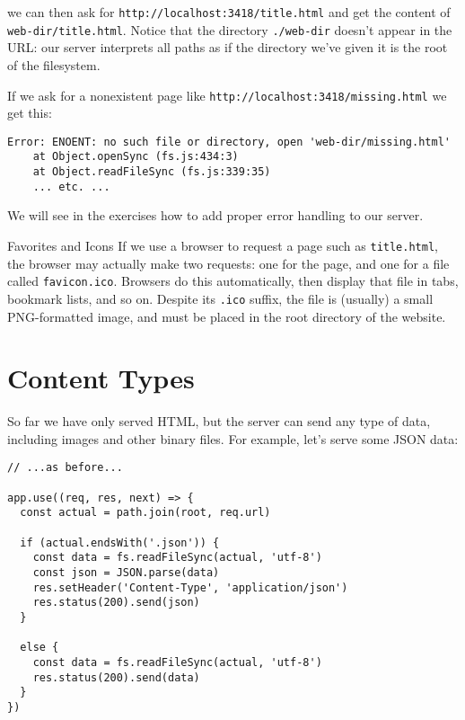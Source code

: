 \noindent
we can then ask for \texttt{http://localhost:3418/title.html}
and get the content of \texttt{web-dir/title.html}.
Notice that the directory \texttt{./web-dir} doesn't appear in the URL:
our server interprets all paths as if the directory we've given it
is the root of the filesystem.


If we ask for a nonexistent page like \texttt{http://localhost:3418/missing.html}
we get this:

\begin{verbatim}
Error: ENOENT: no such file or directory, open 'web-dir/missing.html'
    at Object.openSync (fs.js:434:3)
    at Object.readFileSync (fs.js:339:35)
    ... etc. ...
\end{verbatim}

We will see in the exercises how to add proper error handling to our server.

\begin{aside}{Favorites and Icons}
  If we use a browser to request a page such as \texttt{title.html},
  the browser may actually make two requests:
  one for the page,
  and one for a file called \texttt{favicon.ico}.
  Browsers do this automatically,
  then display that file in tabs, bookmark lists, and so on.
  Despite its \texttt{.ico} suffix,
  the file is (usually) a small PNG-formatted image,
  and must be placed in the root directory of the website.
\end{aside}

\section{Content Types}\label{s:server-content-types}

So far we have only served HTML,
but the server can send any type of data,
including images and other binary files.
For example,
let's serve some JSON data:

\begin{verbatim}
// ...as before...

app.use((req, res, next) => {
  const actual = path.join(root, req.url)

  if (actual.endsWith('.json')) {
    const data = fs.readFileSync(actual, 'utf-8')
    const json = JSON.parse(data)
    res.setHeader('Content-Type', 'application/json')
    res.status(200).send(json)
  }

  else {
    const data = fs.readFileSync(actual, 'utf-8')
    res.status(200).send(data)
  }
})
\end{verbatim}

